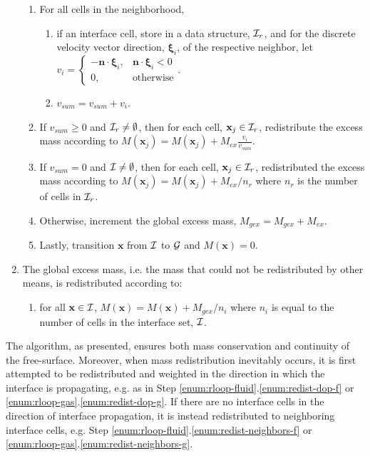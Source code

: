 \documentclass[pdftex,ms]{pittetd}
\newcommand{\pos}{\mathbf{x}}
\newcommand{\pvel}{\boldsymbol{\xi}}
\begin{document}
\begin{enumerate}
\begin{enumerate}
	\item For all cells in the neighborhood,
	\begin{enumerate}
		\item if an interface cell, store in a data structure, $\mathcal{I}_{r}$, and for the discrete velocity vector direction, $\pvel_i$, of the respective neighbor, let $v_i = \begin{cases}
					-\mathbf{n} \cdot \pvel_i, & \mathbf{n} \cdot \pvel_i < 0 \\
					0, & \text{otherwise}
				\end{cases}$.
		\item $v_{sum} = v_{sum} + v_i$.
	\end{enumerate}
	\item \label{enum:redist-dop-g} If $v_{sum} \ge 0$ and $\mathcal{I}_r \neq \emptyset$, then for each cell, $\pos_j \in \iset_r$, redistribute the excess mass according to $M(\pos_j) = M(\pos_j) +  M_{ex} \frac{v_i}{v_{sum}}$.
	\item \label{enum:redist-neighbors-g} If $v_{sum} = 0$ and $\mathcal{I} \neq \emptyset$, then for each cell, $\pos_j \in \iset_r$, redistributed the excess mass according to $M(\pos_j) = M(\pos_j) + M_{ex} / n_r$ where $n_r$ is the number of cells in $\mathcal{I}_r$.
	\item Otherwise, increment the global excess mass, $M_{gex} = M_{gex} + M_{ex}$.
	\item Lastly, transition $\pos$ from $\mathcal{I}$ to $\mathcal{G}$ and $M(\pos) = 0$.
\end{enumerate}
\item \label{enum:final-redist} The global excess mass, i.e. the mass that could not be redistributed by other means, is redistributed according to:
\begin{enumerate}
	\item \label{enum:final-rloop} for all $\pos \in \iset$, $M(\pos) = M(\pos) + M_{gex} / n_i$ where $n_i$ is equal to the number of cells in the interface set, $\mathcal{I}$.
\end{enumerate}
\end{enumerate}
The algorithm, as presented, ensures both mass conservation and continuity of the free-surface.
Moreover, when mass redistribution inevitably occurs, it is first attempted to be redistributed and weighted in the direction in which the interface is propagating, e.g. as in Step \ref{enum:rloop-fluid}.\ref{enum:redist-dop-f} or \ref{enum:rloop-gas}.\ref{enum:redist-dop-g}.
If there are no interface cells in the direction of interface propagation, it is instead redistributed to neighboring interface cells, e.g. Step \ref{enum:rloop-fluid}.\ref{enum:redist-neighbors-f} or \ref{enum:rloop-gas}.\ref{enum:redist-neighbors-g}.
\end{document}
